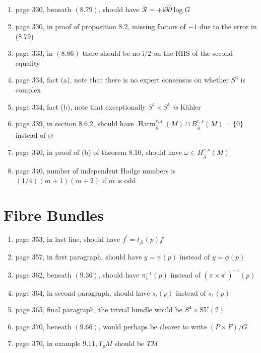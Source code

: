 \documentclass{article}
\begin{document}
\begin{enumerate}
\item page 330, beneath $(8.79)$, should have $\overline{\mathcal{R}}=+\mathrm{i} \overline{\partial \bar{\partial}} \log G$

\item page 330, in proof of proposition $8.2$, missing factors of $-1$ due to the error in (8.79)

\item page 333, in $(8.86)$ there should be no $\mathrm{i} / 2$ on the $\mathrm{RHS}$ of the second equality

\item page 334, fact (a), note that there is no expert consensus on whether $S^{6}$ is complex

\item page 334, fact (b), note that exceptionally $S^{1} \times S^{1}$ \emph{is} Kähler

\item page 339, in section 8.6.2, should have $\operatorname{Harm}_{\bar{\partial}}^{r, s}(M) \cap B_{\bar{\partial}}^{r, s}(M)=\{0\}$ instead of $\varnothing$

\item page 340, in proof of (b) of theorem $8.10$, should have $\omega \in H_{\bar{\partial}}^{r, s}(M)$

\item page 340, number of independent Hodge numbers is $(1 / 4)(m+1)(m+2)$ if $m$ is odd

\end{enumerate}
\section*{Fibre Bundles}

\begin{enumerate}
\item page 353, in last line, should have $f^{\prime}=t_{j i}(p) f$

\item page 357, in first paragraph, should have $y=\psi(p)$ instead of $y=\phi(p)$

\item page 362, beneath $(9.36)$, should have $\pi_{1}^{-1}(p)$ instead of $\left(\pi \times \pi^{\prime}\right)^{-1}(p)$

\item page 364, in second paragraph, should have $s_{i}(p)$ instead of $s_{1}(p)$

\item page 365, final paragraph, the trivial bundle would be $S^{4} \times \mathrm{SU}(2)$

\item page 370, beneath $(9.66)$, would perhaps be clearer to write $(P \times F) / G$

\item page 370, in example $9.11, T_{p} M$ should be $T M$
\end{enumerate}
\end{document}
